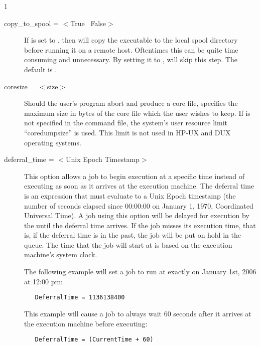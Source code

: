 \begin{ManPage}{\label{man-condor-submit}}{1}
\begin{description}
\item[copy\_to\_spool = $<$True \Bar\ False$>$] If  is set to
, then  will copy the executable to the local spool 
directory before running it on a remote host. Oftentimes this can be quite
time consuming and unnecessary. By setting it to , 
will skip this step. The default is .


\item[coresize = $<$size$>$] Should the user's program abort and produce
a core file,  specifies the maximum size in bytes of the
core file which the user wishes to keep. If  is not
specified in the command file, the system's user resource limit
\mbox{``coredumpsize''} is used.
This limit is not used in HP-UX and DUX operating systems. 


\item[deferral\_time = $<$Unix Epoch Timestamp$>$]
This option allows a job to begin execution at a specific time
instead of executing as soon as it arrives at the execution
machine. The deferral time is an expression that must
evaluate to a Unix Epoch timestamp (the number of
seconds elapsed since 00:00:00 on January 1, 1970, Coordinated
Universal Time). A job using this option will be delayed for
execution by the  until the deferral
time arrives. If the job misses its execution time, that is, if
the deferral time is in the past, the job will be put on hold
in the queue. The time that the job will start at is
based on the execution machine's system clock.

The following example will set a job to run at exactly on
January 1st, 2006 at 12:00 pm:

\begin{verbatim} 
   DeferralTime = 1136138400
\end{verbatim} 

This example will cause a job to always wait 60 seconds after 
it arrives at the execution machine before executing:

\begin{verbatim} 
   DeferralTime = (CurrentTime + 60)
\end{verbatim}


\end{description}
\end{ManPage}
